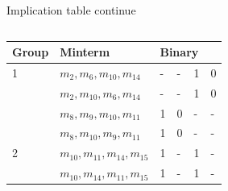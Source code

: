 \documentclass{beamer}
\newcommand{\mcl}[1]{\multicolumn{1}{l|}{#1}}
\begin{document}
\begin{frame}{Implication table continue}
\begin{footnotesize}
\begin{columns}
        
        
        \begin{table}[]
            \begin{tabular}{l|l|llll}
                \hline
                \multicolumn{1}{|l|}{Group}         & Minterm        & \multicolumn{4}{l|}{Binary}     \\ \hline
                \rowcolor{row1} 1 \multirow{4}{*}{} & $m_2,m_6,m_{10},m_{14}$   & \mcl{-} & \mcl{-} & \mcl{1} & 0  \\ \cline{2-6}
                \rowcolor{row1}                     & $m_2,m_{10},m_6,m_{14}$   & \mcl{-} & \mcl{-} & \mcl{1} & 0  \\ \cline{2-6}
                \rowcolor{row1}                     & $m_8,m_9,m_{10},m_{11}$ & \mcl{1} & \mcl{0} & \mcl{-} & - \\ \cline{2-6}
                \rowcolor{row1}                     & $m_8,m_{10},m_9,m_{11}$ & \mcl{1} & \mcl{0} & \mcl{-} & -  \\ \hline
                \rowcolor{row2} 2 \multirow{4}{*}{} & $m_{10},m_{11},m_{14},m_{15}$ & \mcl{1}  & \mcl{-}  & \mcl{1}  &  - \\ \cline{2-6}
                \rowcolor{row2}                     & $m_{10},m_{14},m_{11},m_{15}$ & \mcl{1}  & \mcl{-}  & \mcl{1}  &  -  \\ \hline
            \end{tabular}
        \end{table}
    \end{columns}
\end{footnotesize}
   
\end{frame}
\end{document}
